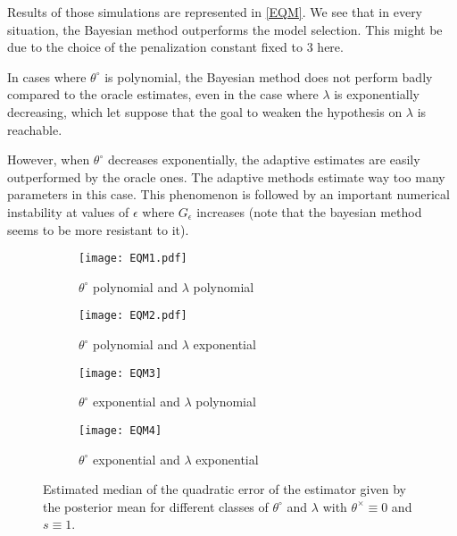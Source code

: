 Results of those simulations are represented in \textsc{\autoref{EQM}}.
We see that in every situation, the Bayesian method outperforms the model selection.
This might be due to the choice of the penalization constant fixed to $3$ here.

\medskip

In cases where $\theta^{\circ}$ is polynomial, the Bayesian method does not perform badly compared to the oracle estimates, even in the case where $\lambda$ is exponentially decreasing, which let suppose that the goal to weaken the hypothesis on $\lambda$ is reachable.

However, when $\theta^{\circ}$ decreases exponentially, the adaptive estimates are easily outperformed by the oracle ones.
The adaptive methods estimate way too many parameters in this case.
This phenomenon is followed by an important numerical instability at values of $\epsilon$ where $G_{\epsilon}$ increases (note that the bayesian method seems to be more resistant to it).

\begin{figure}
\centering
\begin{subfigure}{.5\textwidth}
  \centering
  \texttt{[image: EQM1.pdf]}
  \caption{$\theta^{\circ}$ polynomial and $\lambda$ polynomial}
  \label{fig3:sub1}
\end{subfigure}%
\begin{subfigure}{.5\textwidth}
  \centering
  \texttt{[image: EQM2.pdf]}
  \caption{$\theta^{\circ}$ polynomial and $\lambda$ exponential}
  \label{fig3:sub2}
\end{subfigure}
\begin{subfigure}{.5\textwidth}
  \centering
  \texttt{[image: EQM3]}
  \caption{$\theta^{\circ}$ exponential and $\lambda$ polynomial}
  \label{fig3:sub3}
\end{subfigure}%
\begin{subfigure}{.5\textwidth}
  \centering
  \texttt{[image: EQM4]}
  \caption{$\theta^{\circ}$ exponential and $\lambda$ exponential}
  \label{fig3:sub4}
\end{subfigure}
\caption{Estimated median of the quadratic error of the estimator given by the posterior mean for different classes of $\theta^{\circ}$ and $\lambda$ with $\theta^{\times} \equiv 0$ and $s \equiv 1$.}
\label{EQM}
\end{figure}